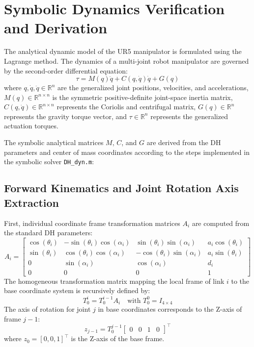 \documentclass[journal]{IEEEtran}
\begin{document}
\section{Symbolic Dynamics Verification and Derivation}
The analytical dynamic model of the UR5 manipulator is formulated using the Lagrange method. The dynamics of a multi-joint robot manipulator are governed by the second-order differential equation:
\begin{equation}
    \tau = M(q)\ddot{q} + C(q, \dot{q})\dot{q} + G(q)
\end{equation}
where $q, \dot{q}, \ddot{q} \in \mathbb{R}^n$ are the generalized joint positions, velocities, and accelerations, $M(q) \in \mathbb{R}^{n \times n}$ is the symmetric positive-definite joint-space inertia matrix, $C(q, \dot{q}) \in \mathbb{R}^{n \times n}$ represents the Coriolis and centrifugal matrix, $G(q) \in \mathbb{R}^n$ represents the gravity torque vector, and $\tau \in \mathbb{R}^n$ represents the generalized actuation torques.

The symbolic analytical matrices $M$, $C$, and $G$ are derived from the DH parameters and center of mass coordinates according to the steps implemented in the symbolic solver \texttt{DH\_dyn.m}:

\subsection{Forward Kinematics and Joint Rotation Axis Extraction}
First, individual coordinate frame transformation matrices $A_i$ are computed from the standard DH parameters:
\begin{equation}
    A_i = \begin{bmatrix}
        \cos(\theta_i) & -\sin(\theta_i)\cos(\alpha_i) & \sin(\theta_i)\sin(\alpha_i) & a_i\cos(\theta_i) \\
        \sin(\theta_i) & \cos(\theta_i)\cos(\alpha_i) & -\cos(\theta_i)\sin(\alpha_i) & a_i\sin(\theta_i) \\
        0 & \sin(\alpha_i) & \cos(\alpha_i) & d_i \\
        0 & 0 & 0 & 1
    \end{bmatrix}
\end{equation}
The homogeneous transformation matrix mapping the local frame of link $i$ to the base coordinate system is recursively defined by:
\begin{equation}
    T_0^i = T_0^{i-1} A_i \quad \text{with } T_0^0 = I_{4 \times 4}
\end{equation}
The axis of rotation for joint $j$ in base coordinates corresponds to the Z-axis of frame $j-1$:
\begin{equation}
    z_{j-1} = T_0^{j-1} \begin{bmatrix} 0 & 0 & 1 & 0 \end{bmatrix}^\top
\end{equation}
where $z_0 = [0, 0, 1]^\top$ is the Z-axis of the base frame.
\end{document}
